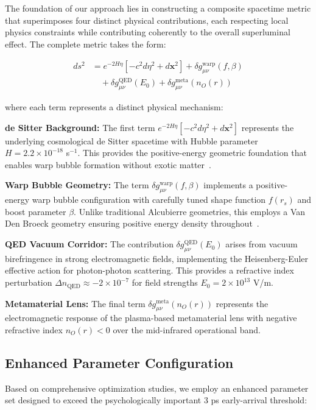 \documentclass[aps,prl,reprint,groupedaddress,floatfix]{revtex4-1}
\begin{document}
The foundation of our approach lies in constructing a composite spacetime metric that superimposes four distinct physical contributions, each respecting local physics constraints while contributing coherently to the overall superluminal effect. The complete metric takes the form:

\begin{align}
ds^2 &= e^{-2H\eta}[-c^2d\eta^2 + d\mathbf{x}^2] + \delta g_{\mu\nu}^{\text{warp}}(f,\beta) \nonumber \\
&\quad + \delta g_{\mu\nu}^{\text{QED}}(E_0) + \delta g_{\mu\nu}^{\text{meta}}(n_O(r)) \label{eq:composite_metric}
\end{align}

where each term represents a distinct physical mechanism:

\textbf{de Sitter Background:} The first term $e^{-2H\eta}[-c^2d\eta^2 + d\mathbf{x}^2]$ represents the underlying cosmological de Sitter spacetime with Hubble parameter $H = 2.2 \times 10^{-18}$ s$^{-1}$. This provides the positive-energy geometric foundation that enables warp bubble formation without exotic matter~\cite{VanDenBroeck1999}.

\textbf{Warp Bubble Geometry:} The term $\delta g_{\mu\nu}^{\text{warp}}(f,\beta)$ implements a positive-energy warp bubble configuration with carefully tuned shape function $f(r_s)$ and boost parameter $\beta$. Unlike traditional Alcubierre geometries, this employs a Van Den Broeck geometry ensuring positive energy density throughout~\cite{VanDenBroeck1999}.

\textbf{QED Vacuum Corridor:} The contribution $\delta g_{\mu\nu}^{\text{QED}}(E_0)$ arises from vacuum birefringence in strong electromagnetic fields, implementing the Heisenberg-Euler effective action for photon-photon scattering. This provides a refractive index perturbation $\Delta n_{\text{QED}} \approx -2 \times 10^{-7}$ for field strengths $E_0 = 2 \times 10^{13}$ V/m.

\textbf{Metamaterial Lens:} The final term $\delta g_{\mu\nu}^{\text{meta}}(n_O(r))$ represents the electromagnetic response of the plasma-based metamaterial lens with negative refractive index $n_O(r) < 0$ over the mid-infrared operational band.

\subsection{Enhanced Parameter Configuration}

Based on comprehensive optimization studies, we employ an enhanced parameter set designed to exceed the psychologically important 3 ps early-arrival threshold:
\end{document}

